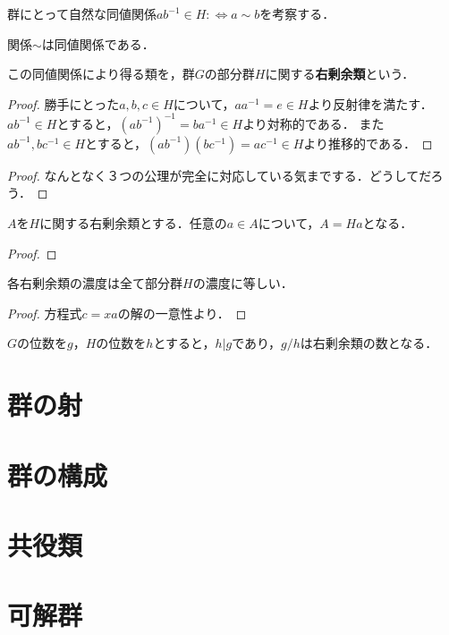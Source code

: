 \documentclass[uplatex,dvipdfmx]{jsreport}
\begin{document}
群にとって自然な同値関係$ab^{-1}\in H:\Leftrightarrow a\sim b$を考察する．
\begin{proposition}
    関係$\sim$は同値関係である．

    この同値関係により得る類を，群$G$の部分群$H$に関する\textbf{右剰余類}という．
\end{proposition}
\begin{proof}
    勝手にとった$a,b,c\in H$について，$aa^{-1}=e\in H$より反射律を満たす．
    $ab^{-1}\in H$とすると，$(ab^{-1})^{-1}=ba^{-1}\in H$より対称的である．
    また$ab^{-1},bc^{-1}\in H$とすると，$(ab^{-1})(bc^{-1})=ac^{-1}\in H$より推移的である．
\end{proof}
\begin{proof}
    なんとなく３つの公理が完全に対応している気までする．どうしてだろう．
\end{proof}

\begin{proposition}
    $A$を$H$に関する右剰余類とする．任意の$a\in A$について，$A=Ha$となる．
\end{proposition}
\begin{proof}
    
\end{proof}

\begin{proposition}
    各右剰余類の濃度は全て部分群$H$の濃度に等しい．
\end{proposition}
\begin{proof}
    方程式$c=xa$の解の一意性より．
\end{proof}
\begin{corollary}
    $G$の位数を$g$，$H$の位数を$h$とすると，$h|g$であり，$g/h$は右剰余類の数となる．
\end{corollary}

\section{群の射}



\section{群の構成}

\section{共役類}

\section{可解群}
\end{document}
